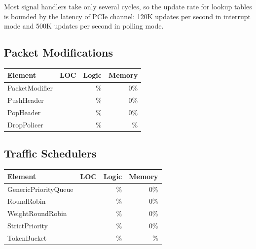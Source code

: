 Most signal handlers take only several cycles, so the update rate for lookup tables is bounded by the latency of PCIe channel: 120K updates per second in interrupt mode and 500K updates per second in polling mode.

\subsection{Packet Modifications}

\begin{table}[h!]
	\centering
	\label{tab:PacketModElements}
	\begin{tabular}{l|r|r|r}
		Element & LOC & Logic & Memory \\
		\hline
		PacketModifier 	& & \% & 0\% \\
		PushHeader		& & \% & 0\% \\
		PopHeader		& & \% & 0\% \\
		DropPolicer 	& & \% & \% \\
	\end{tabular}
\end{table}

\subsection{Traffic Schedulers}

\begin{table}[h!]
	\centering
	\label{tab:TrafficSchedulers}
	\begin{tabular}{l|r|r|r}
		Element & LOC & Logic & Memory \\
		\hline
		GenericPriorityQueue 	& & \% & 0\% \\
		RoundRobin		& & \% & 0\% \\
		WeightRoundRobin		& & \% & 0\% \\
		StrictPriority		& & \% & 0\% \\
		TokenBucket 	& & \% & \% \\
	\end{tabular}
\end{table}
